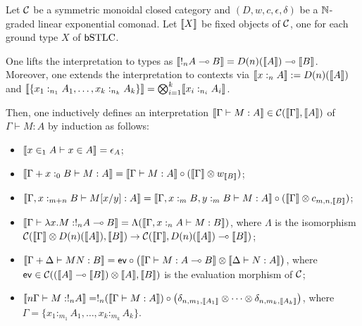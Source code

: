 \begin{definition}
Let $\mathcal{C}$ be a symmetric monoidal closed category and $(D, w,c,\epsilon,\delta)$ be a $\mathbb{N}$-graded linear exponential comonad. 
Let $\llbracket X\rrbracket$ be fixed objects of $\mathcal{C} $, one for each ground type $X$ of $\mathsf b\mathrm{STLC}$. 

One lifts the interpretation to types as 
$\llbracket!_{n}A\multimap B\rrbracket=D(n)(\llbracket A\rrbracket)\multimap \llbracket B\rrbracket$. Moreover, one extends the interpretation to contexts via $\llbracket x:_{n}A\rrbracket:= D(n)(\llbracket A\rrbracket)$ and 
$\llbracket\{x_{1}:_{n_{1}}A_{1},\dots, x_{k}:_{n_{k}}A_{k}\}\rrbracket=
\bigotimes_{i=1}^{k}\llbracket x_{i}:_{n_{i}}A_{i}\rrbracket$.

Then, one inductively defines an interpretation $\llbracket\Gamma \vdash M:A\rrbracket\in \mathcal{C}(\llbracket\Gamma\rrbracket, \llbracket A\rrbracket)$ of $\Gamma \vdash M:A$ by induction as follows:
 \begin{itemize}
\item $\llbracket x\in_{1}A\vdash x\in A\rrbracket=\epsilon_{A}$;
\item $\llbracket\Gamma+x:_{0}B\vdash M:A\rrbracket =
\llbracket\Gamma \vdash M:A\rrbracket
\circ (\llbracket\Gamma\rrbracket\otimes  w_{\llbracket B\rrbracket})
$;
\item $\llbracket\Gamma, x:_{m+n}B \vdash M[x/y]:A\rrbracket=
\llbracket\Gamma, x:_{m}B, y:_{m}B \vdash M:A\rrbracket
\circ
(\llbracket\Gamma\rrbracket \otimes c_{m,n,\llbracket B\rrbracket})
$;
\item $\llbracket\Gamma \vdash \lambda x.M: !_{n}A\multimap B\rrbracket=
\Lambda (\llbracket\Gamma, x:_{n}A \vdash M:B\rrbracket)
$, where $\Lambda$ is the isomorphism $ \mathcal{C}(\llbracket\Gamma\rrbracket \otimes D(n)(\llbracket A\rrbracket), \llbracket B\rrbracket) \to \mathcal{C}(\llbracket\Gamma\rrbracket, D(n)(\llbracket A\rrbracket)\multimap \llbracket B\rrbracket)$;

\item $\llbracket\Gamma+\Delta \vdash MN:B\rrbracket=
\mathsf{ev}\circ \big( \llbracket\Gamma \vdash M:A\multimap B\rrbracket
\otimes
\llbracket\Delta \vdash N:A\rrbracket\big)$, where $\mathsf{ev}\in \mathcal{C}((\llbracket A\rrbracket\multimap \llbracket B\rrbracket)\otimes \llbracket A\rrbracket, \llbracket B\rrbracket)$ is the evaluation morphism of $\mathcal{C}$;


\item $\llbracket n\Gamma\vdash M:!_{n}A\rrbracket=
 !_{n}(\llbracket\Gamma \vdash M:A\rrbracket)\circ \big(\delta_{n,m_{1},\llbracket A_{1}\rrbracket}\otimes \dots \otimes 
\delta_{n,m_{k},\llbracket A_{k}\rrbracket}\big)
$, where $\Gamma=\{x_{1}:_{m_{1}}A_{1},\dots, x_{k}:_{m_{k}}A_{k}\}$.

\end{itemize}
\end{definition}


